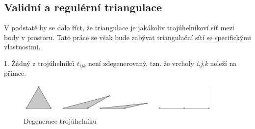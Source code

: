 \documentclass[12pt,a4paper]{article}
\begin{document}
\newpage
\begin{figure}[h!]
\centering
\begin{floatrow}
\end{floatrow}
\end{figure}

\newpage
\subsection{Validní a regulérní triangulace}
V podstatě by se dalo říct, že triangulace je jakákoliv trojúhelníkoví síť mezi body v prostoru. Tato práce se však bude zabývat triangulační sítí se specifickými vlastnostmi.

1. Žádný z trojúhelníků $t_{ijk}$ není zdegenerovaný, tzn. že vrcholy \textit{i,j,k} neleží na přímce.
\begin{figure}[h!]
\centering
\includegraphics[width=0.9\textwidth]{../img/podm_1.png}
\caption{Degenerace trojúhelníku}
\label{fig:podm_1}
\end{figure}
\end{document}
